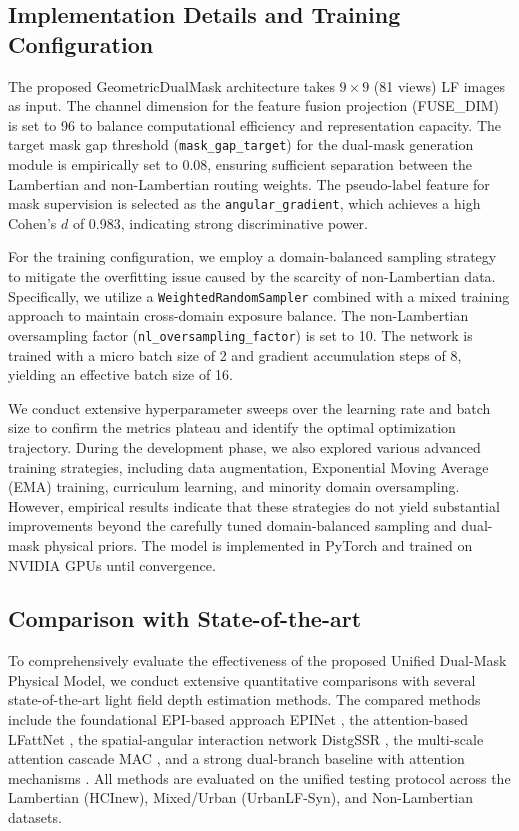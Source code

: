 \subsection{Implementation Details and Training Configuration}
The proposed GeometricDualMask architecture takes $9 \times 9$ (81 views) LF images as input. The channel dimension for the feature fusion projection (FUSE\_DIM) is set to 96 to balance computational efficiency and representation capacity. The target mask gap threshold (\texttt{mask\_gap\_target}) for the dual-mask generation module is empirically set to 0.08, ensuring sufficient separation between the Lambertian and non-Lambertian routing weights. The pseudo-label feature for mask supervision is selected as the \texttt{angular\_gradient}, which achieves a high Cohen's $d$ of 0.983, indicating strong discriminative power.

For the training configuration, we employ a domain-balanced sampling strategy to mitigate the overfitting issue caused by the scarcity of non-Lambertian data. Specifically, we utilize a \texttt{WeightedRandomSampler} combined with a mixed training approach to maintain cross-domain exposure balance. The non-Lambertian oversampling factor (\texttt{nl\_oversampling\_factor}) is set to 10. The network is trained with a micro batch size of 2 and gradient accumulation steps of 8, yielding an effective batch size of 16. 

We conduct extensive hyperparameter sweeps over the learning rate and batch size to confirm the metrics plateau and identify the optimal optimization trajectory. During the development phase, we also explored various advanced training strategies, including data augmentation, Exponential Moving Average (EMA) training, curriculum learning, and minority domain oversampling. However, empirical results indicate that these strategies do not yield substantial improvements beyond the carefully tuned domain-balanced sampling and dual-mask physical priors. The model is implemented in PyTorch and trained on NVIDIA GPUs until convergence.

\subsection{Comparison with State-of-the-art}

To comprehensively evaluate the effectiveness of the proposed Unified Dual-Mask Physical Model, we conduct extensive quantitative comparisons with several state-of-the-art light field depth estimation methods. The compared methods include the foundational EPI-based approach EPINet \cite{shin2018epinet}, the attention-based LFattNet \cite{wang2019lfattnet}, the spatial-angular interaction network DistgSSR \cite{wang2020distgssr}, the multi-scale attention cascade MAC \cite{jin2021mac}, and a strong dual-branch baseline with attention mechanisms \cite{li2022dualbranch}. All methods are evaluated on the unified testing protocol across the Lambertian (HCInew), Mixed/Urban (UrbanLF-Syn), and Non-Lambertian datasets. 

